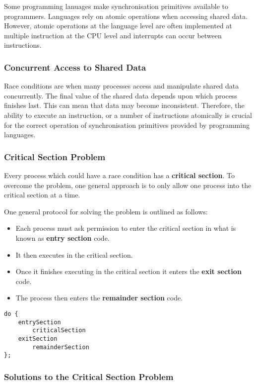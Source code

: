 \documentclass{article}%
\begin{document}
Some programming lanuages make synchronisation primitives available to programmers.
Languages rely on atomic operations when accessing shared data.
However, atomic operations at the language level are often implemented at multiple instruction at the CPU level and interrupts can occur between instructions.

\subsubsection{Concurrent Access to Shared Data}
\label{sec:org4ec3ec6}
Race conditions are when many processes access and manipulate shared data concurrently.
The final value of the shared data depends upon which process finishes last.
This can mean that data may become inconsistent.
Therefore, the ability to execute an instruction, or a number of instructions atomically is crucial for the correct operation of synchronisation primitives provided by programming languages.

\subsubsection{Critical Section Problem}
\label{sec:orgcff50db}
Every process which could have a race condition has a \textbf{critical section}.
To overcome the problem, one general approach is to only allow one process into the critical section at a time.

One general protocol for solving the problem is outlined as follows:
\begin{itemize}
\item Each process must ask permission to enter the critical section in what is known as \textbf{entry section} code.
\item It then executes in the critical section.
\item Once it finishes executing in the critical section it enters the \textbf{exit section} code.
\item The process then enters the \textbf{remainder section} code.
\end{itemize}
\begin{verbatim}
do {
    entrySection
        criticalSection
    exitSection
        remainderSection
};
\end{verbatim}

\subsubsection{Solutions to the Critical Section Problem}
\label{sec:orgd7d86a1}
\end{document}

